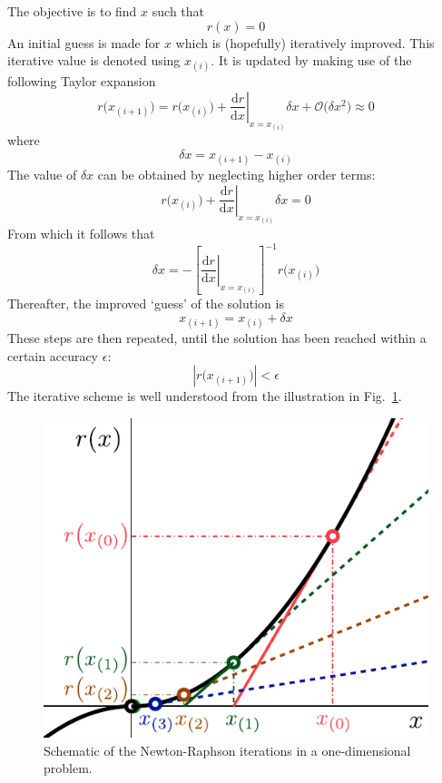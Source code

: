 \documentclass[times,namecite]{goose-article}
\begin{document}
The objective is to find $x$ such that
\begin{equation}
  r(x) = 0
\end{equation}
An initial guess is made for $x$ which is (hopefully) iteratively improved. This iterative value is denoted using $x_{(i)}$. It is updated by making use of the following Taylor expansion
\begin{equation}
  r \big( x_{(i+1)} \big)
  =
  r \big( x_{(i)} \big)
  +
  \left. \frac{\mathrm{d} r}{\mathrm{d} x} \right|_{x = x_{(i)}} \delta x
  +
  \mathcal{O} \big( \delta x^2 \big)
  \approx
  0
\end{equation}
where
\begin{equation}
  \delta x = x_{(i+1)} - x_{(i)}
\end{equation}
The value of $\delta x$ can be obtained by neglecting higher order terms:
\begin{equation}
  r \big( x_{(i)} \big)
  +
  \left. \frac{\mathrm{d} r}{\mathrm{d} x} \right|_{x = x_{(i)}} \delta x
  =
  0
\end{equation}
From which it follows that
\begin{equation}
  \delta x
  =
  - \left[ \left. \frac{\mathrm{d} r}{\mathrm{d} x} \right|_{x = x_{(i)}} \right]^{-1}
  r \big( x_{(i)} \big)
\end{equation}
Thereafter, the improved `guess' of the solution is
\begin{equation}
  x_{(i+1)} = x_{(i)} + \delta x
\end{equation}
These steps are then repeated, until the solution has been reached within a certain accuracy $\epsilon$:
\begin{equation}
  \left| r \big( x_{(i+1)} \big) \right| < \epsilon
\end{equation}
The iterative scheme is well understood from the illustration in Fig.~\ref{fig:newton-raphson}.

\begin{figure}[htp]
  \centering
  \includegraphics[width=.4\textwidth]{figures/newton-raphson.pdf}
  \caption{Schematic of the Newton-Raphson iterations in a one-dimensional problem.}
  \label{fig:newton-raphson}
\end{figure}
\end{document}
